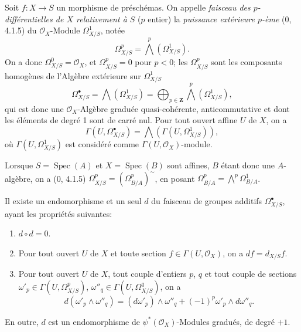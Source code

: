 \begin{env}[16.6.1]
Soit $f:X\to S$ un morphisme de préschémas. On appelle \emph{faisceau des
$p$-différentielles de $X$ relativement à $S$} ($p$ entier) la
\emph{puissance extérieure $p$-ème} (0, 4.1.5) du $\mathcal{O}_X$-Module
$\Omega_{X/S}^1$, notée
\[
  \Omega_{X/S}^p=\bigwedge^p(\Omega_{X/S}^1).
  \tag{16.6.1.1}
  \label{IV.16.6.1.1}
\]
On a donc $\Omega_{X/S}^0=\mathcal{O}_X$, et $\Omega_{X/S}^p=0$ pour $p<0$;
les $\Omega_{X/S}^p$ sont les composants homogènes de l'Algèbre extérieure
sur $\Omega_{X/S}^1$
\[
  \Omega_{X/S}^{\bullet}=\bigwedge(\Omega_{X/S}^1)
  =\bigoplus_{p\in\mathbf{Z}}\bigwedge^p(\Omega_{X/S}^1),
  \tag{16.6.1.2}
  \label{IV.16.6.1.2}
\]
qui est donc une $\mathcal{O}_X$-Algèbre graduée quasi-cohérente,
anticommutative et dont les éléments de degré 1 sont de carré nul. Pour tout
ouvert affine $U$ de $X$, on a
\[
  \Gamma(U,\Omega_{X/S}^{\bullet})
  =\bigwedge(\Gamma(U,\Omega_{X/S}^1)),
\]
où $\Gamma(U,\Omega_{X/S}^1)$ est considéré comme
$\Gamma(U,\mathcal{O}_X)$-module.

Lorsque $S=\operatorname{Spec}(A)$ et $X=\operatorname{Spec}(B)$ sont
affines, $B$ étant donc une $A$-algèbre, on a (0, 4.1.5)
$\Omega_{X/S}^p=(\Omega_{B/A}^p)^{\sim}$, en posant
$\Omega_{B/A}^p=\bigwedge^p\Omega_{B/A}^1$.
\end{env}

\begin{theorem}[16.6.2]
\label{IV.16.6.2}
Il existe un endomorphisme et un seul $d$ du faisceau de groupes additifs
$\Omega_{X/S}^{\bullet}$, ayant les propriétés suivantes:
\begin{enumerate}
\item[(i)] $d\circ d=0$.
\item[(ii)] Pour tout ouvert $U$ de $X$ et toute section
$f\in\Gamma(U,\mathcal{O}_X)$, on a $df=d_{X/S}f$.
\item[(iii)] Pour tout ouvert $U$ de $X$, tout couple d'entiers $p$, $q$ et
tout couple de sections
$\omega'_p\in\Gamma(U,\Omega_{X/S}^p)$,
$\omega''_q\in\Gamma(U,\Omega_{X/S}^q)$, on a
\[
  d(\omega'_p\wedge\omega''_q)
  =(d\omega'_p)\wedge\omega''_q
  +(-1)^p\omega'_p\wedge d\omega''_q.
  \tag{16.6.2.1}
  \label{IV.16.6.2.1}
\]
\end{enumerate}
En outre, $d$ est un endomorphisme de $\psi^*(\mathcal{O}_X)$-Modules
gradués, de degré $+1$.
\end{theorem}

